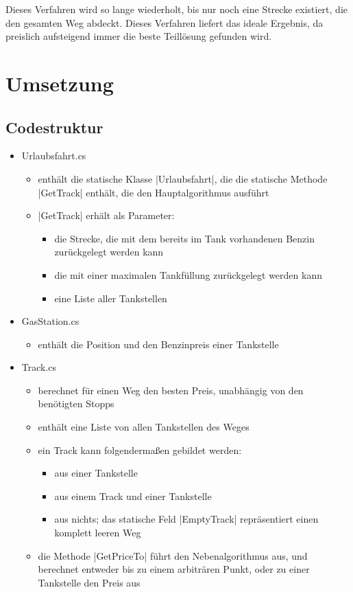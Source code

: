 \documentclass[a4paper,10pt,ngerman]{scrartcl}
\begin{document}
Dieses Verfahren wird so lange wiederholt, bis nur noch eine Strecke existiert, die den gesamten Weg abdeckt. Dieses Verfahren liefert das ideale Ergebnis, da preislich aufsteigend immer die beste Teillösung gefunden wird. 

\section{Umsetzung}

\subsection{Codestruktur}

\begin{itemize}
	\item Urlaubsfahrt.cs
	\begin{itemize}
		\item enthält die statische Klasse |Urlaubsfahrt|, die die statische Methode |GetTrack| enthält, die den Hauptalgorithmus ausführt
		\item |GetTrack| erhält als Parameter:
		 \begin{itemize}
		 	\item die Strecke, die mit dem bereits im Tank vorhandenen Benzin zurückgelegt werden kann
		 	\item die mit einer maximalen Tankfüllung zurückgelegt werden kann
		 	\item eine Liste aller Tankstellen
		\end{itemize}
    \end{itemize}
    
    \item GasStation.cs
    \begin{itemize}
        \item enthält die Position und den Benzinpreis einer Tankstelle
    \end{itemize}

    \item Track.cs
	\begin{itemize}
		\item berechnet für einen Weg den besten Preis, unabhängig von den benötigten Stopps
		\item enthält eine Liste von allen Tankstellen des Weges
		\item ein Track kann folgendermaßen gebildet werden:
		\begin{itemize}
			\item aus einer Tankstelle
			\item aus einem Track und einer Tankstelle
			\item aus nichts; das statische Feld |EmptyTrack| repräsentiert einen komplett leeren Weg
		\end{itemize}
        \item die Methode |GetPriceTo| führt den Nebenalgorithmus aus, und berechnet entweder bis zu einem arbiträren Punkt, oder zu einer Tankstelle den Preis aus
    \end{itemize}


\end{itemize}
\end{document}
